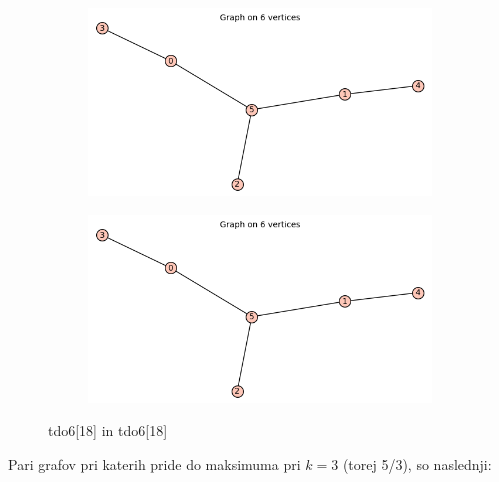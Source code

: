 \documentclass[12pt, a4paper]{article}
\begin{document}
\begin{center}
\begin{figure}[!htb]
\centering
\begin{subfigure}{0.5\textwidth}
  \centering
  \includegraphics[width=0.5\linewidth]{tdo6[18]}
\end{subfigure}%
\begin{subfigure}{0.5\textwidth}
  \centering
  \includegraphics[width=0.5\linewidth]{tdo6[18]}
\end{subfigure}
\caption{tdo6[18] in tdo6[18]}
\label{fig:test}
\end{figure}

\end{center}
Pari grafov pri katerih pride do maksimuma pri $k=3$ (torej 5/3), so naslednji:
\end{document}
